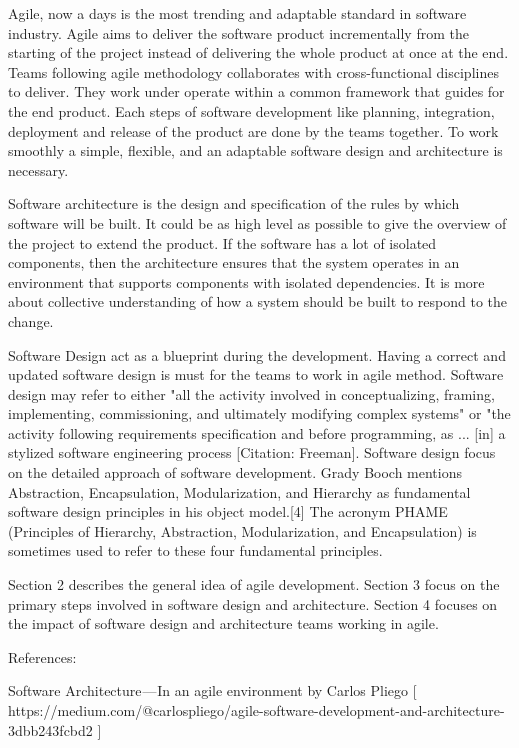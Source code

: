 Agile, now a days is the most trending and adaptable standard in software industry. Agile aims to deliver the software product incrementally from the starting of the project instead of delivering the whole product at once at the end. Teams following agile methodology collaborates with cross-functional disciplines to deliver. They work under operate within a common framework that guides for the end product. Each steps of software development like planning, integration, deployment and release of the product are done by the teams together. To work smoothly a simple, flexible, and an adaptable software design and architecture is necessary. 


Software architecture is the design and specification of the rules by which software will be built. It could be as high level as possible to give the overview of the project to extend the product. If the software has a lot of isolated components, then the architecture ensures that the system operates in an environment that supports components with isolated dependencies. It is more about collective understanding of how a system should be built to respond to the change.

Software Design act as a blueprint during the development. Having a correct and updated software design is must for the teams to work in agile method.
Software design may refer to either "all the activity involved in conceptualizing, framing, implementing, commissioning, and ultimately modifying complex systems" or "the activity following requirements specification and before programming, as ... [in] a stylized software engineering process [Citation: Freeman]. 
Software design focus on the detailed approach of software development. Grady Booch mentions Abstraction, Encapsulation, Modularization, and Hierarchy as fundamental software design principles in his object model.[4] The acronym PHAME (Principles of Hierarchy, Abstraction, Modularization, and Encapsulation) is sometimes used to refer to these four fundamental principles.

Section 2 describes the general idea of agile 
development. Section 3 focus on the primary steps involved in software design and architecture. Section 4 focuses on the impact of software design and architecture teams working in agile.



References:

Software Architecture — In an agile environment by Carlos Pliego [ https://medium.com/@carlospliego/agile-software-development-and-architecture-3dbb243fcbd2 ]

